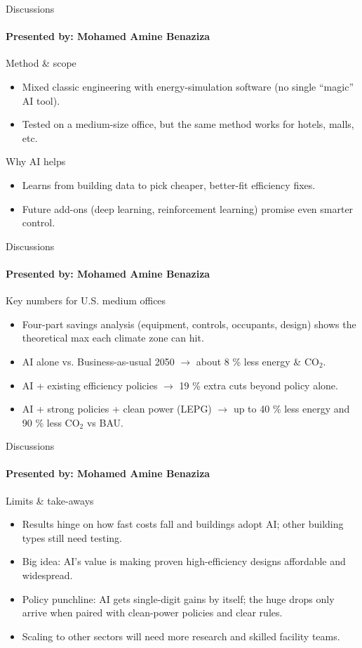 \documentclass{beamer}
\begin{document}
\begin{frame}{Discussions}
\framesubtitle{Presented by: Mohamed Amine Benaziza}

Method \& scope
\begin{itemize}
    \item Mixed classic engineering with energy-simulation software (no single “magic” AI
tool).
    \item Tested on a medium-size office, but the same method works for hotels, malls, etc.
\end{itemize}
Why AI helps
\begin{itemize}
    \item Learns from building data to pick cheaper, better-fit efficiency fixes.
    \item Future add-ons (deep learning, reinforcement learning) promise even smarter control.
\end{itemize}

\end{frame}

\begin{frame}{Discussions}
\framesubtitle{Presented by: Mohamed Amine Benaziza}

Key numbers for U.S. medium offices
\begin{itemize}
    \item Four-part savings analysis (equipment, controls, occupants, design) shows
the theoretical max each climate zone can hit.
    \item AI alone vs. Business-as-usual 2050 $\to$ about 8 \% less energy \& CO$_2$.
    \item AI + existing efficiency policies $\to$ 19 \% extra cuts beyond policy alone.
    \item AI + strong policies + clean power (LEPG) $\to$ up to 40 \% less energy and 90 \% less CO$_2$ vs BAU.
\end{itemize}

\end{frame}

\begin{frame}{Discussions}
\framesubtitle{Presented by: Mohamed Amine Benaziza}

Limits \& take-aways
\begin{itemize}
    \item Results hinge on how fast costs fall and buildings adopt AI; other building types still need testing.
    \item Big idea: AI’s value is making proven high-efficiency designs affordable and widespread.
    \item Policy punchline: AI gets single-digit gains by itself; the huge drops only arrive when paired with clean-power policies and clear rules.
    \item Scaling to other sectors will need more research and skilled facility teams.
\end{itemize}

\end{frame}
\end{document}
